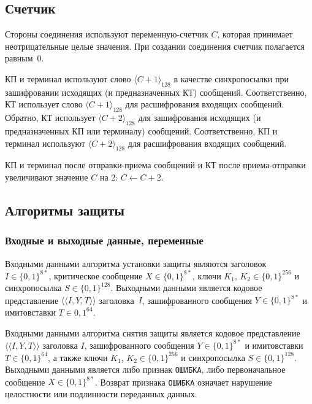 \subsection{Счетчик}\label{CRYPTO.SM.Ctr}

Стороны соединения используют переменную-счетчик $C$, которая принимает 
неотрицательные целые значения. При создании соединения счетчик 
полагается равным~$0$.

КП и терминал используют слово $\langle C + 1 \rangle_{128}$ в качестве 
синхропосылки при зашифровании исходящих (и предназначенных КТ) сообщений. 
Соответственно, КТ использует слово $\langle C + 1 \rangle_{128}$ для 
расшифрования входящих сообщений. Обратно, КТ использует $\langle C + 2 
\rangle_{128}$ для зашифрования исходящих (и предназначенных КП или 
терминалу) сообщений. Соответственно, КП и терминал используют $\langle C + 2 
\rangle_{128}$ для расшифрования входящих сообщений. 

КП и терминал после отправки-приема сообщений и КТ после приема-отправки 
увеличивают значение $C$ на 2: $C\gets C + 2$.

\subsection{Алгоритмы защиты}\label{CRYPTO.SM.Algs}

\subsubsection{Входные и выходные данные, переменные}
\label{CRYPTO.SM.Algs.InOut}

Входными данными алгоритма установки защиты являются заголовок~$I\in\{0,1\}^{8*}$, 
критическое сообщение $X \in\{0,1\}^{8*}$, 
ключи $K_1$, $K_2\in\{0,1\}^{256}$ и 
синхропосылка $S\in\{0,1\}^{128}$.
Выходными данными является кодовое представление 
$\langle\langle I, Y, T \rangle\rangle$
заголовка~$I$, зашифрованного сообщения $Y \in\{0,1\}^{8*}$ 
и имитовставки $T \in {0,1}^{64}$.

Входными данными алгоритма снятия защиты является кодовое представление 
$\langle\langle I, Y, T\rangle\rangle$ заголовка $I$, зашифрованного 
сообщения $Y \in\{0,1\}^{8*}$ и имитовставки $T \in\{0, 1\}^{64}$, а также 
ключи $K_1$, $K_2 \in\{0,1\}^{256}$ и синхропосылка $S \in\{0,1\}^{128}$. 
Выходными данными является либо признак \texttt{ОШИБКА}, либо 
первоначальное сообщение $X \in\{0,1\}^{8*}$. 
Возврат признака \texttt{ОШИБКА} означает нарушение целостности или 
подлинности переданных данных.


